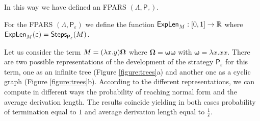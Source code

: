 In this way we have defined an FPARS $(\Lambda,\mathsf{P}_\varepsilon)$.
\begin{notation}
	For the FPARS $(\Lambda,\mathsf{P}_\varepsilon)$ we define the function $\textsf{ExpLen}_{M}:[0,1]\rightarrow\mathbb{R}$ where
	$\textsf{ExpLen}_{M}(\varepsilon)=\textsf{Steps}_{\mathsf{P}_\varepsilon}(M)$.
\end{notation}
\begin{example}
	Let us consider the term $M=(\lambda x.y)\bm{\Omega}$ where $\bm{\Omega}=\bm{\omega\omega}$  with $\bm{\omega}=\lambda x.xx$. There are two possible representations of the development of the strategy $\mathsf{P}_\varepsilon$ for this term, one as an infinite tree (Figure \ref{figure:trees}a) and another one as a cyclic graph (Figure \ref{figure:trees}b). According to the different representations, we can compute in different ways the probability of reaching normal form and the average derivation length. The results coincide yielding in both cases probability of termination equal to $1$ and average derivation length equal to $\frac{1}{\varepsilon}$. 
\end{example}
